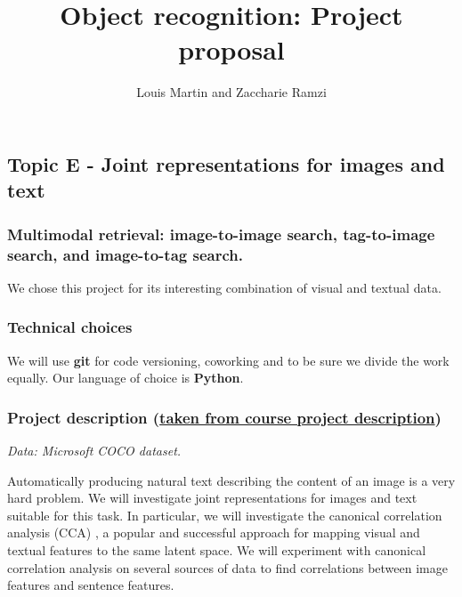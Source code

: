 \documentclass[a4paper,12pt]{article}
\begin{document}
\title{Object recognition: Project proposal}
\author{Louis Martin and Zaccharie Ramzi}

\maketitle

\subsection*{Topic E - Joint representations for images and text}
\subsubsection*{Multimodal retrieval: image-to-image search, tag-to-image search,
and image-to-tag search.}
We chose this project for its interesting combination of visual and textual data.

\subsubsection*{Technical choices}
We will use \textbf{git} for code versioning, coworking and to be sure we divide the work
equally. Our language of choice is \textbf{Python}.

\subsubsection*{Project description (\href{https://docs.google.com/document/d/1Efj_dul7iRcpWMyoVltM_xot4q2QfqkbW58DAR2TuFo/edit}{taken from course project description})}
\textit{Data: Microsoft COCO dataset.}

Automatically producing natural text describing the content of an image is a
very hard problem. We will investigate joint representations for images and text
suitable for this task. In particular, we will investigate the canonical
correlation analysis (CCA) \cite{normalizedcca}, a popular and successful approach for mapping
visual and textual features to the same latent space. We will experiment with
canonical correlation analysis on several sources of data to find correlations
between image features and sentence features.
\end{document}
